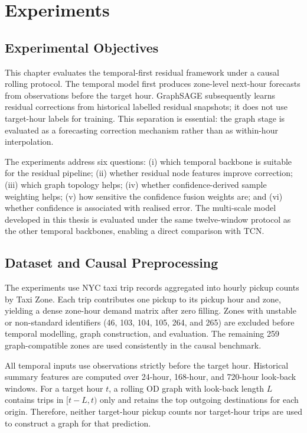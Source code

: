 \documentclass[12pt,a4paper]{report}
\begin{document}
	\chapter{Experiments}
	\label{chap:experiments}
	
	\section{Experimental Objectives}
	
	This chapter evaluates the temporal-first residual framework under a causal rolling protocol. The temporal model first produces zone-level next-hour forecasts from observations before the target hour. GraphSAGE subsequently learns residual corrections from historical labelled residual snapshots; it does not use target-hour labels for training. This separation is essential: the graph stage is evaluated as a forecasting correction mechanism rather than as within-hour interpolation.
	
The experiments address six questions: (i) which temporal backbone is suitable for the residual pipeline; (ii) whether residual node features improve correction; (iii) which graph topology helps; (iv) whether confidence-derived sample weighting helps; (v) how sensitive the confidence fusion weights are; and (vi) whether confidence is associated with realised error. The multi-scale model developed in this thesis is evaluated under the same twelve-window protocol as the other temporal backbones, enabling a direct comparison with TCN.
	
	\section{Dataset and Causal Preprocessing}
	
	The experiments use NYC taxi trip records aggregated into hourly pickup counts by Taxi Zone. Each trip contributes one pickup to its pickup hour and zone, yielding a dense zone-hour demand matrix after zero filling. Zones with unstable or non-standard identifiers (46, 103, 104, 105, 264, and 265) are excluded before temporal modelling, graph construction, and evaluation. The remaining 259 graph-compatible zones are used consistently in the causal benchmark.
	
	All temporal inputs use observations strictly before the target hour. Historical summary features are computed over 24-hour, 168-hour, and 720-hour look-back windows. For a target hour $t$, a rolling OD graph with look-back length $L$ contains trips in $[t-L,t)$ only and retains the top outgoing destinations for each origin. Therefore, neither target-hour pickup counts nor target-hour trips are used to construct a graph for that prediction.
	
\end{document}

